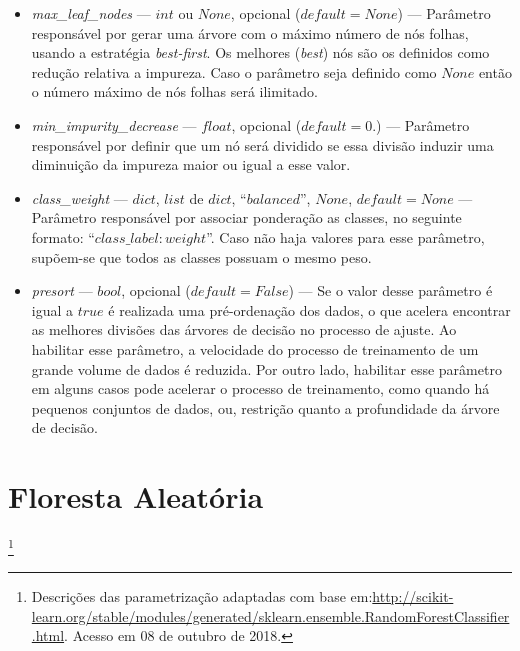 \documentclass[
	12pt,				%
	oneside,			%
	a4paper,			%
	english,			%
	brazil				%
	]{abntex2ppgsi}
\begin{document}
{{{\begin{apendicesenv}
\begin{itemize}
\item \textit{max\_leaf\_nodes} --- $int$ ou $None$, opcional ($default=None$) --- Parâmetro responsável por gerar uma árvore com o máximo número de nós folhas, usando a estratégia \textit{best-first}.
Os melhores (\textit{best}) nós são os definidos como redução relativa a impureza. Caso o parâmetro seja definido como $None$ então o número máximo de nós folhas será ilimitado. 
\item \textit{min\_impurity\_decrease} --- $float$, opcional ($default=0.$) --- Parâmetro responsável por definir que um nó será dividido se essa divisão induzir uma diminuição da impureza maior ou igual a esse valor.
\item \textit{class\_weight} --- $dict$, $list$ de $dict$, ``$balanced$'', $None$, $default=None$ --- Parâmetro responsável por associar ponderação as classes, no seguinte formato: ``${class\_label: weight}$''. Caso não haja valores para esse parâmetro, supõem-se que todos as classes possuam o mesmo peso. 
\item \textit{presort} --- $bool$, opcional ($default=False$) --- Se o valor desse parâmetro é igual a $true$ é realizada uma pré-ordenação dos dados, o que acelera encontrar as melhores divisões das árvores de decisão no processo de ajuste. Ao habilitar esse parâmetro, a velocidade do processo de treinamento de um grande volume de dados  é reduzida. Por outro lado, habilitar esse parâmetro em alguns casos pode acelerar o processo de treinamento, como quando há pequenos conjuntos de dados, ou, restrição quanto a profundidade da árvore de decisão.
\end{itemize}

\section{Floresta Aleatória}\footnote{Descrições das parametrização adaptadas com base em:\url{http://scikit-learn.org/stable/modules/generated/sklearn.ensemble.RandomForestClassifier.html}. Acesso em 08 de outubro de 2018.}


\end{apendicesenv}}}}
\end{document}
